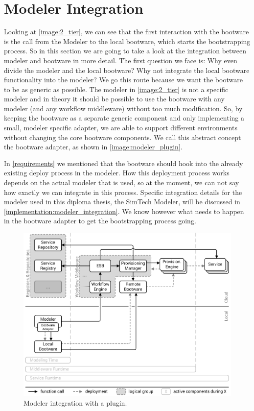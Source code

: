 \section{Modeler Integration}
\label{design:modeler_integration}

Looking at \autoref{image:2_tier}, we can see that the first interaction with the bootware is the call from the Modeler to the local bootware, which starts the bootstrapping process.
So in this section we are going to take a look at the integration between modeler and bootware in more detail.
The first question we face is: Why even divide the modeler and the local bootware?
Why not integrate the local bootware functionality into the modeler?
We go this route because we want the bootware to be as generic as possible.
The modeler in \autoref{image:2_tier} is not a specific modeler and in theory it should be possible to use the bootware with any modeler (and any workflow middleware) without too much modification.
So, by keeping the bootware as a separate generic component and only implementing a small, modeler specific adapter, we are able to support different environments without changing the core bootware components.
We call this abstract concept the bootware adapter, as shown in \autoref{image:modeler_plugin}.

In \autoref{requirements} we mentioned that the bootware should hook into the already existing deploy process in the modeler.
How this deployment process works depends on the actual modeler that is used, so at the moment, we can not say how exactly we can integrate in this process.
Specific integration details for the modeler used in this diploma thesis, the SimTech Modeler, will be discussed in \autoref{implementation:modeler_integration}.
We know however what needs to happen in the bootware adapter to get the bootstrapping process going.

\begin{figure}[!htbp]
	\centering
	\includegraphics[resolution=600]{design/assets/modeler_plugin}
	\caption{Modeler integration with a plugin.}
	\label{image:modeler_plugin}
\end{figure}


